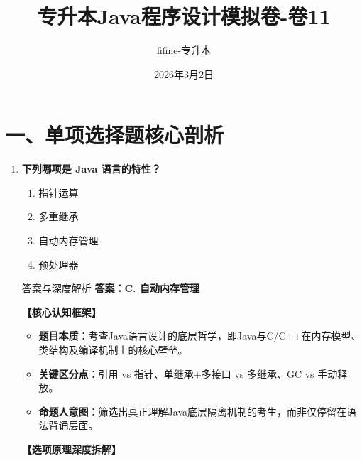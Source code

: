 \documentclass[12pt, a4paper]{ctexart}
\begin{document}
\title{\textcolor{myblue}{\textbf{专升本Java程序设计模拟卷-卷11}}}
\author{fifine-专升本}
\date{2026年3月2日}

\maketitle
\thispagestyle{empty}
\newpage

\section{一、单项选择题核心剖析}

\begin{enumerate}[label=\textbf{\arabic*.}]

	\item \textbf{下列哪项是 Java 语言的特性？}
	      \begin{enumerate}[label=\Alph*.]
		      \item 指针运算
		      \item 多重继承
		      \item 自动内存管理
		      \item 预处理器
	      \end{enumerate}

	      \begin{bluebox}{答案与深度解析}
		      \textbf{答案：C. 自动内存管理}

		      \textbf{【核心认知框架】}
		      \begin{itemize}[leftmargin=*, nosep]
			      \item \textbf{题目本质}：考查Java语言设计的底层哲学，即Java与C/C++在内存模型、类结构及编译机制上的核心壁垒。
			      \item \textbf{关键区分点}：引用 vs 指针、单继承+多接口 vs 多继承、GC vs 手动释放。
			      \item \textbf{命题人意图}：筛选出真正理解Java底层隔离机制的考生，而非仅停留在语法背诵层面。
		      \end{itemize}

		      \textbf{【选项原理深度拆解】}


\end{bluebox}
\end{enumerate}
\end{document}
